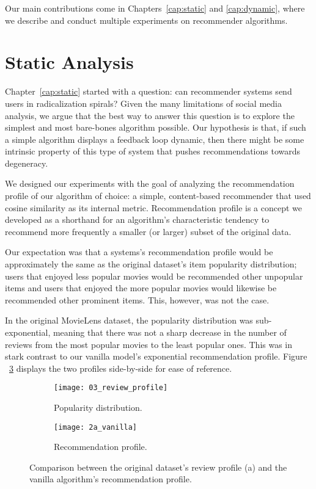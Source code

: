 Our main contributions come in Chapters~\ref{cap:static} and \ref{cap:dynamic},
where we describe and conduct multiple experiments on recommender algorithms.

\section{Static Analysis}
\label{sec:static}

Chapter~\ref{cap:static} started with a question: can recommender systems send
users in radicalization spirals? Given the many limitations of social media
analysis, we argue that the best way to answer this question is to explore the
simplest and most bare-bones algorithm possible. Our hypothesis is that, if such
a simple algorithm displays a feedback loop dynamic, then there might be some
intrinsic property of this type of system that pushes recommendations towards
degeneracy.

We designed our experiments with the goal of analyzing the recommendation
profile of our algorithm of choice: a simple, content-based recommender that
used cosine similarity as its internal metric. Recommendation profile is a
concept we developed as a shorthand for an algorithm's characteristic tendency
to recommend more frequently a smaller (or larger) subset of the original data.

Our expectation was that a systems's recommendation profile would be
approximately the same as the original dataset's item popularity distribution;
users that enjoyed less popular movies would be recommended other unpopular
items and users that enjoyed the more popular movies would likewise be
recommended other prominent items. This, however, was not the case.

In the original MovieLens \citep{harper_movielens_2015} dataset, the popularity
distribution was sub-exponential, meaning that there was not a sharp decrease in
the number of reviews from the most popular movies to the least popular ones.
This was in stark contrast to our vanilla model's exponential recommendation
profile. Figure ~\ref{fig:fig05_profile_comparison} displays the two profiles
side-by-side for ease of reference.

\begin{figure}
  \centering
  \begin{subfigure}{0.45\textwidth}
    \centering
    \texttt{[image: 03\_review\_profile]}
    \caption{Popularity distribution.\label{fig:fig05_review_profile}}
  \end{subfigure}
  \begin{subfigure}{0.45\textwidth}
    \centering
    \texttt{[image: 2a\_vanilla]}
    \caption{Recommendation profile.\label{fig:fig05_vanilla_profile}}
  \end{subfigure}
  \caption{Comparison between the original dataset's review profile (a) and the
  vanilla algorithm's recommendation
  profile.\label{fig:fig05_profile_comparison}}
\end{figure}

